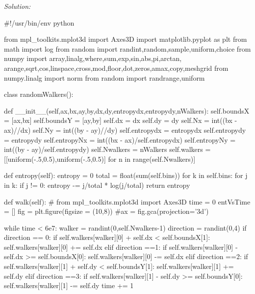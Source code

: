 \ifsolutions
\textit{Solution:}\\
\begin{codeexample}
\begin{VerbatimOut}{\listingFile}
#!/usr/bin/env python

from mpl_toolkits.mplot3d import Axes3D
import matplotlib.pyplot as plt
from math import log
from random import randint,random,sample,uniform,choice
from numpy import array,linalg,where,sum,exp,sin,abs,pi,arctan, arange,sqrt,cos,linspace,cross,mod,floor,dot,zeros,amax,copy,meshgrid
from numpy.linalg import norm
from random import randrange,uniform



class randomWalkers():

    def __init__(self,ax,bx,ay,by,dx,dy,entropydx,entropydy,nWalkers):
        self.boundsX = [ax,bx]
        self.boundsY = [ay,by]
        self.dx = dx
        self.dy = dy
        self.Nx = int((bx - ax)//dx)
        self.Ny = int((by - ay)//dy)
        self.entropydx = entropydx
        self.entropydy = entropydy
        self.entropyNx = int((bx - ax)/self.entropydx)
        self.entropyNy = int((by - ay)/self.entropydy)
        self.Nwalkers = nWalkers
        self.walkers = [[uniform(-.5,0.5),uniform(-.5,0.5)] for n in range(self.Nwalkers)]

    def entropy(self):
        entropy = 0
        total = float(sum(self.bins))
        for k in self.bins:
            for j in k:
                if j != 0:
                    entropy -= j/total * log(j/total)
        return entropy


    def walk(self):
        #        from mpl_toolkits.mplot3d import Axes3D
        time = 0
        entVsTime = []
        fig = plt.figure(figsize = (10,8))
        #ax = fig.gca(projection='3d')

        while time < 6e7:
            walker = randint(0,self.Nwalkers-1)
            direction = randint(0,4)
            if direction == 0:
                if self.walkers[walker][0] + self.dx < self.boundsX[1]:
                    self.walkers[walker][0] += self.dx
            elif direction ==1:
                if self.walkers[walker][0] - self.dx >= self.boundsX[0]:
                    self.walkers[walker][0] -= self.dx
            elif direction ==2:
                if self.walkers[walker][1] + self.dy < self.boundsY[1]:
                    self.walkers[walker][1] += self.dy
            elif direction ==3:
                if self.walkers[walker][1] - self.dy >= self.boundsY[0]:
                    self.walkers[walker][1] -= self.dy
            time += 1


\end{VerbatimOut}
\end{codeexample}
